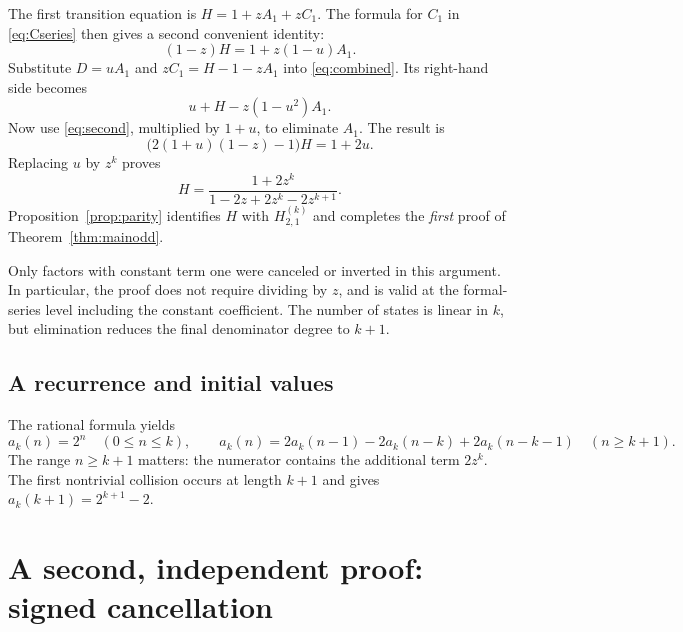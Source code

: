 \documentclass[11pt,letterpaper]{article}
\numberwithin{equation}{section}
\theoremstyle{definition}
\theoremstyle{remark}
\begin{document}
The first transition equation is $H=1+zA_1+zC_1$.
The formula for $C_1$ in \eqref{eq:Cseries} then gives a second convenient
identity:
\begin{equation}
 (1-z)H=1+z(1-u)A_1.
 \label{eq:second}
\end{equation}
Substitute $D=uA_1$ and $zC_1=H-1-zA_1$ into
\eqref{eq:combined}. Its right-hand side becomes
\[
 u+H-z(1-u^2)A_1.
\]
Now use \eqref{eq:second}, multiplied by $1+u$, to eliminate $A_1$.
The result is
\[
 \bigl(2(1+u)(1-z)-1\bigr)H=1+2u.
\]
Replacing $u$ by $z^k$ proves
\[
 H=\frac{1+2z^k}{1-2z+2z^k-2z^{k+1}}.
\]
Proposition~\ref{prop:parity} identifies $H$ with $H_{2,1}^{(k)}$ and
completes the \emph{first} proof of Theorem~\ref{thm:mainodd}.

Only factors with constant term one were canceled or inverted in this
argument. In particular, the proof does not require dividing by $z$, and
is valid at the formal-series level including the constant coefficient.
The number of states is linear in $k$, but elimination reduces the final
denominator degree to $k+1$.

\subsection{A recurrence and initial values}
\label{sec:recurrence}

The rational formula yields
\begin{equation}
 a_k(n)=2^n\quad(0\le n\le k),
 \qquad
 a_k(n)=2a_k(n-1)-2a_k(n-k)+2a_k(n-k-1)
 \quad(n\ge k+1).
 \label{eq:oddrec}
\end{equation}
The range $n\ge k+1$ matters: the numerator contains the additional term
$2z^k$. The first nontrivial collision occurs at length $k+1$ and gives
$a_k(k+1)=2^{k+1}-2$.

\begin{table}[htbp]
\centering
\small

\caption{Initial odd-coefficient counts. These values are produced by the
recurrence \eqref{eq:oddrec}, and independently by exact polynomial
expansion, by the uniform $4k+2$-state automaton of
Table~\ref{tab:parity}, and by the signed sparse products of
Section~\ref{sec:signed}.}
\label{tab:odd}
\end{table}

\section{A second, independent proof: signed cancellation}
\label{sec:signed}
\end{document}
